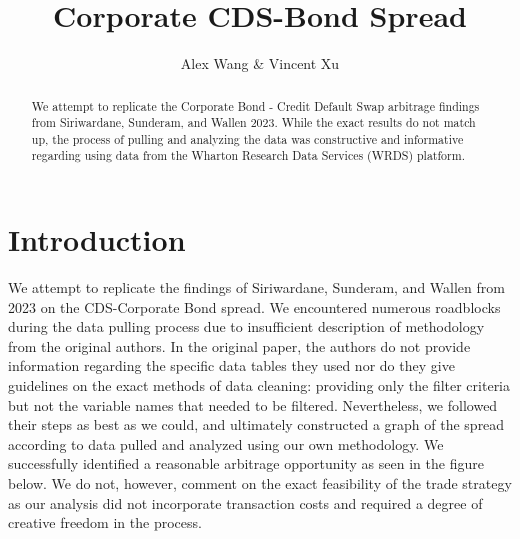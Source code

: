 \documentclass[12pt]{article}
\begin{document}
\title{
Corporate CDS-Bond Spread
}

\author{
Alex Wang \& Vincent Xu
}
\begin{titlepage}
% 
\maketitle


\doublespacing
\begin{abstract}
We attempt to replicate the Corporate Bond - Credit Default Swap arbitrage findings from 
Siriwardane, Sunderam, and Wallen 2023. While the exact results do not match up,
the process of pulling and analyzing the data was constructive and informative
regarding using data from the Wharton Research Data Services (WRDS) platform.

\end{abstract}


\end{titlepage}

\doublespacing
\section{Introduction}

We attempt to replicate the findings of Siriwardane, Sunderam, and Wallen from 2023
on the CDS-Corporate Bond spread. We encountered numerous roadblocks during the
data pulling process due to insufficient description of methodology from the
original authors. In the original paper, the authors do not provide information
regarding the specific data tables they used nor do they give guidelines on
the exact methods of data cleaning: providing only the filter criteria but
not the variable names that needed to be filtered.
Nevertheless, we followed their steps as best as we could, and
ultimately constructed a graph of the spread according to data pulled and analyzed
using our own methodology. We successfully identified a reasonable arbitrage
opportunity as seen in the figure below. We do not, however, comment on the exact 
feasibility of the trade strategy as our analysis did not incorporate transaction
costs and required a degree of creative freedom in the process.
\end{document}
